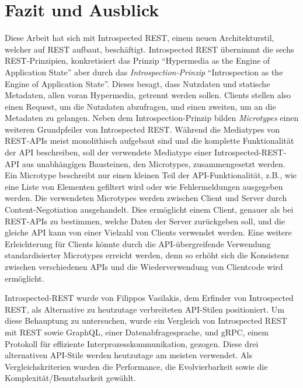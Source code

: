 \chapter{Fazit und Ausblick}\label{ch:conclusion}

Diese Arbeit hat sich mit Introspected REST, einem neuen Architekturstil, welcher auf REST aufbaut, beschäftigt. Introspected REST übernimmt die sechs REST-Prinzipien, konkretisiert das Prinzip \enquote{Hypermedia as the Engine of Application State} aber durch das \emph{Introspection-Prinzip} \enquote{Introspection as the Engine of Application State}. Dieses besagt, dass Nutzdaten und statische Metadaten, allen voran Hypermedia, getrennt werden sollen. Clients stellen also einen Request, um die Nutzdaten abzufragen, und einen zweiten, um an die Metadaten zu gelangen. Neben dem Introspection-Prinzip bilden \emph{Microtypes} einen weiteren Grundpfeiler von Introspected REST. Während die Mediatypes von REST-APIs meist monolithisch aufgebaut sind und die komplette Funktionalität der API beschreiben, soll der verwendete Mediatype einer Introspected-REST-API aus unabhängigen Bausteinen, den Microtypes, zusammengesetzt werden. Ein Microtype beschreibt nur einen kleinen Teil der API-Funktionalität, z.B., wie eine Liste von Elementen gefiltert wird oder wie Fehlermeldungen ausgegeben werden. Die verwendeten Microtypes werden zwischen Client und Server durch Content-Negotiation ausgehandelt. Dies ermöglicht einem Client, genauer als bei REST-APIs zu bestimmen, welche Daten der Server zurückgeben soll, und die gleiche API kann von einer Vielzahl von Clients verwendet werden. Eine weitere Erleichterung für Clients könnte durch die API-übergreifende Verwendung standardisierter Microtypes erreicht werden, denn so erhöht sich die Konsistenz zwischen verschiedenen APIs und die Wiederverwendung von Clientcode wird ermöglicht.

Introspected-REST wurde von Filippos Vasilakis, dem Erfinder von Introspected REST, als Alternative zu heutzutage verbreiteten API-Stilen positioniert. Um diese Behauptung zu untersuchen, wurde ein Vergleich von Introspected REST mit REST sowie GraphQL, einer Datenabfragesprache, und gRPC, einem Protokoll für effiziente Interprozesskommunikation, gezogen. Diese drei alternativen API-Stile werden heutzutage am meisten verwendet. Als Vergleichskriterien wurden die Performance, die Evolvierbarkeit sowie die Komplexität/Benutzbarkeit gewählt.

